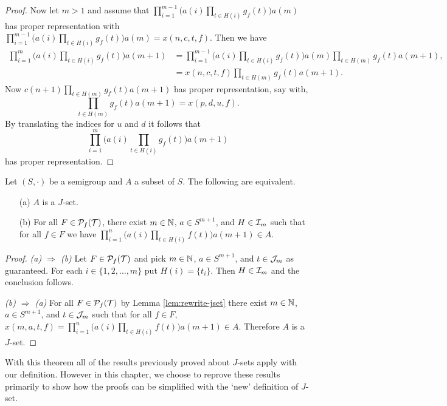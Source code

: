 \begin{proof}
  Now let $m > 1$ and assume that $\prod_{i=1}^{m-1} \bigl( a(i) \prod_{t \in H(i)} g_f(t) \bigr) a(m)$ has proper representation with $\prod_{i=1}^{m-1} \bigl( a(i) \prod_{t \in H(i)} g_f(t) \bigr) a(m) = x(n, c, t, f)$. 
  Then we have 
  \begin{align*}
    \textstyle
    \prod_{i=1}^{m} \bigl( a(i) \prod_{t \in H(i)} g_f(t) \bigr) a(m+1) &= \textstyle
    \prod_{i=1}^{m-1} \bigl( a(i) \prod_{t \in H(i)} g_f(t) \bigr) a(m) \prod_{t \in H(m)} g_f(t) a(m+1), \\
    &= \textstyle 
    x(n, c, t, f) \prod_{t \in H(m)} g_f(t) a(m+1).
  \end{align*}
  Now $c(n+1) \prod_{t \in H(m)} g_f(t) a(m+1)$ has proper representation, say with, 
  \[
    \textstyle
    \prod_{t \in H(m)} g_f(t) a(m+1) = x(p, d, u, f).
  \]
  By translating the indices for $u$ and $d$ it follows that 
  \[
    \textstyle
    \prod_{i=1}^{m} \bigl( a(i) \prod_{t \in H(i)} g_f(t) \bigr) a(m+1)
  \]
  has proper representation.
\end{proof}

\begin{thm}
  Let $(S, \cdot)$ be a semigroup and $A$ a subset of $S$.
  The following are equivalent. 
  \begin{itemize}
    \item[(a)] $A$ is a $J$-set.
    \item[(b)] For all $F \in \mathcal{P}_f(\mathcal{T})$, there exist $m \in \mathbb{N}$, $a \in S^{m+1}$, and $H \in \mathcal{I}_m$ such that for all $f \in F$ we have $\prod_{i=1}^n\bigl( a(i) \prod_{t \in H(i)} f(t) \bigr) a(m+1) \in A$.
  \end{itemize}
\end{thm}
\begin{proof}
  \textsl{(a) $\Rightarrow$ (b)}
  Let $F \in \mathcal{P}_f(\mathcal{T})$ and pick $m \in \mathbb{N}$, $a \in S^{m+1}$, and $t \in \mathcal{J}_m$ as guaranteed. 
  For each $i \in \{1, 2, \ldots, m\}$ put $H(i) = \{ t_i\}$. 
  Then $H \in \mathcal{I}_m$ and the conclusion follows. 

  \textsl{(b) $\Rightarrow$ (a)}
  For all $F \in \mathcal{P}_f(\mathcal{T})$ by Lemma \ref{lem:rewrite-jset} there exist $m \in \mathbb{N}$, $a \in S^{m+1}$, and $t \in \mathcal{J}_m$ such that for all $f \in F$, $x(m, a, t, f) = \prod_{i=1}^n\bigl(a(i)\prod_{t \in H(i)} f(t)\bigr)a(m+1) \in A$.
  Therefore $A$ is a $J$-set.
\end{proof}

With this theorem all of the results previously proved about $J$-sets apply  with our definition.
However in this chapter, we choose to reprove these results primarily to show how the proofs can be simplified with the `new' definition of $J$-set.

